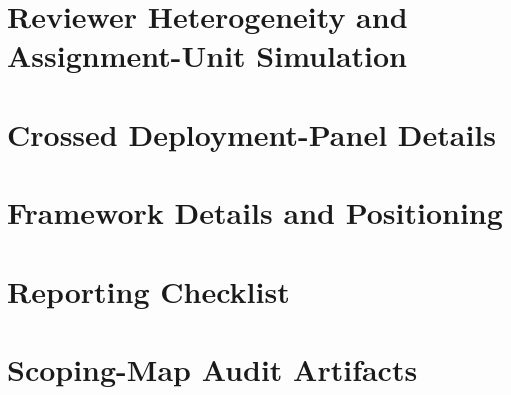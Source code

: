 \documentclass[11pt]{article}
\begin{document}
\FloatBarrier


\FloatBarrier
\section{Reviewer Heterogeneity and Assignment-Unit Simulation}
\label{sec:appendix-sim}







\FloatBarrier
\section{Crossed Deployment-Panel Details}
\label{sec:appendix-cmj}





\FloatBarrier
\section{Framework Details and Positioning}








\FloatBarrier
\section{Reporting Checklist}
\label{sec:appendix-eval}


\FloatBarrier
\section{Scoping-Map Audit Artifacts}
\label{sec:audit-artifacts}





\FloatBarrier
\end{document}
